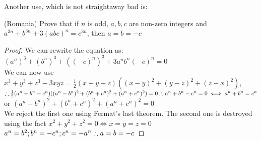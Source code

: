 Another use, which is not straightaway bad is:\\
\begin{example}
(Romania)
Prove that if $n$ is odd, $a,b,c$ are non-zero integers and $a^{3n}+b^{3n}+3(abc)^{n}=c^{3n}$, then $a=b=-c$
\end{example}
\begin{proof}
    We can rewrite the equation as: $(a^n)^3+(b^n)^3+((-c)^n)^3+3a^nb^n(-c)^n=0$\\
    We can now use $x^3+y^3+z^3-3xyz= \frac{1}{2}(x+y+z)((x-y)^2+(y-z)^2+(z-x)^2)$,\\
    $\therefore \frac{1}{2}(a^n+b^n-c^n)((a^n-b^n)^2+(b^n+c^n)^2+(a^n+c^n)^2)=0\\
    \therefore a^n+b^n-c^n=0 \iff a^n+b^n=c^n$ or $(a^n-b^n)^2+(b^n+c^n)^2+(a^n+c^n)^2=0$\\
    We reject the first one using Fermat's last theorem. The second one is destroyed using the fact $x^2+y^2+z^2=0 \iff x=y=z=0$\\
    $a^n=b^2; b^n=-c^n; c^n=-a^n\\
    \therefore a=b=-c$
\end{proof}
